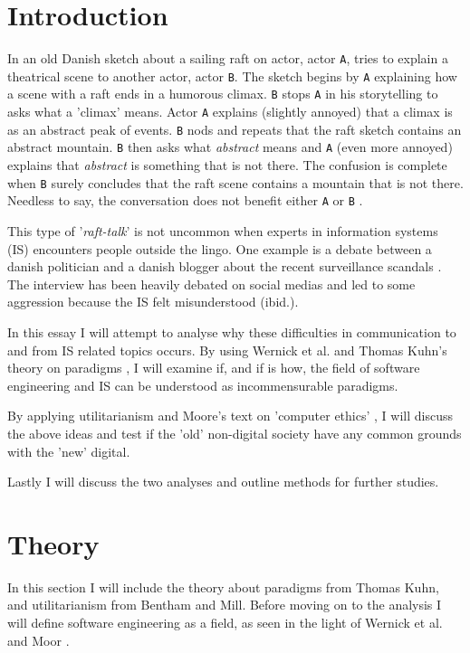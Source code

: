 \documentclass{article}
\begin{document}
\section{Introduction}
In an old Danish sketch about a sailing raft on actor, actor \texttt{A}, tries to explain a theatrical scene to another actor, actor \texttt{B}. The sketch begins by \texttt{A} explaining how a scene with a raft ends in a humorous climax. \texttt{B} stops \texttt{A} in his storytelling to asks what a 'climax' means. Actor \texttt{A} explains (slightly annoyed) that a climax is as an abstract peak of events. \texttt{B} nods and repeats that the raft sketch contains an abstract mountain. \texttt{B} then asks what \textit{abstract} means and \texttt{A} (even more annoyed) explains that \textit{abstract} is something that is not there. The confusion is complete when \texttt{B} surely concludes that the raft scene contains a mountain that is not there. Needless to say, the conversation does not benefit either \texttt{A} or \texttt{B} \citep{Raft:2014}.

This type of '\textit{raft-talk}' is not uncommon when experts in information systems (IS) encounters people outside the lingo. One example is a debate between a danish politician and a danish blogger about the recent surveillance scandals \citep{Bramsen:2014}. The interview has been heavily debated on social medias and led to some aggression because the IS felt misunderstood (ibid.).

In this essay I will attempt to analyse why these difficulties in communication to and from IS related topics occurs.
By using Wernick et al. and Thomas Kuhn's theory on paradigms \citep{Wernick:2004, Holm:2004}, I will examine if, and if is how, the field of software engineering and IS can be understood as incommensurable paradigms.

By applying utilitarianism and Moore's text on 'computer ethics' \citep{Moor:1985}, I will discuss the above ideas and test if the 'old' non-digital society have any common grounds with the 'new' digital.

Lastly I will discuss the two analyses and outline methods for further studies.

\section{Theory}
In this section I will include the theory about paradigms from Thomas Kuhn, and utilitarianism from Bentham and Mill. Before moving on to the analysis I will define software engineering as a field, as seen in the light of Wernick et al. and Moor \citep{Wernick:2004, Moor:1985}.
\end{document}
